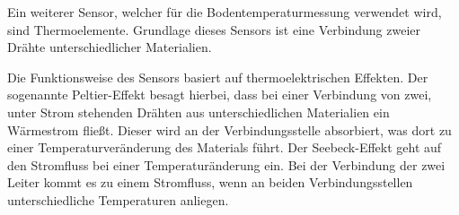 Ein weiterer Sensor, welcher für die Bodentemperaturmessung verwendet wird,
sind Thermoelemente. Grundlage dieses Sensors ist eine Verbindung zweier Drähte
unterschiedlicher Materialien. 


Die Funktionsweise des Sensors basiert auf
thermoelektrischen Effekten. Der sogenannte Peltier-Effekt besagt hierbei, dass
bei einer Verbindung von zwei, unter Strom stehenden Drähten aus
unterschiedlichen Materialien ein Wärmestrom fließt. Dieser wird an der
Verbindungsstelle absorbiert, was dort zu einer Temperaturveränderung des
Materials führt. Der Seebeck-Effekt geht auf den Stromfluss bei einer
Temperaturänderung ein. Bei der Verbindung der zwei Leiter kommt es zu einem
Stromfluss, wenn an beiden Verbindungsstellen unterschiedliche Temperaturen
anliegen.\cite{bernhard2014thermoelemente}


